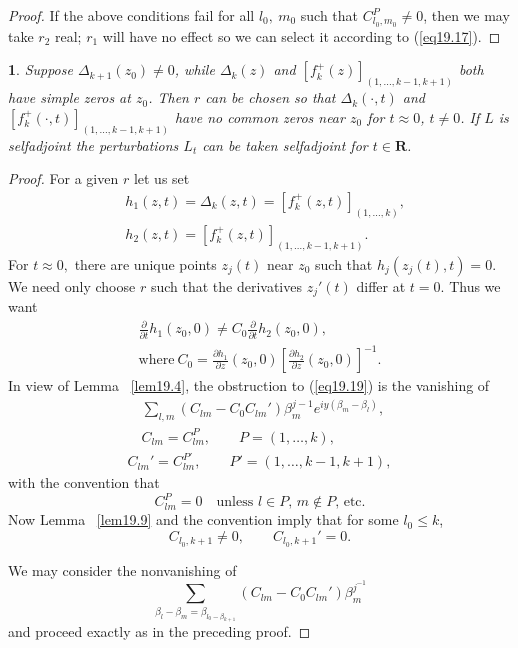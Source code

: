 \documentclass{surv-l}
\theoremstyle{plain}
\newtheorem{lemma}[theorem]{\sc{Lemma}}
\theoremstyle{definition}
\numberwithin{equation}{chapter}
\begin{document}
\begin{proof}
If the above conditions fail for all $l_{0},\ m_{0}$ such that $C_{l_{0},m_{0}}^{P}\neq 0$, then we may take $r_{2}$ real; $r_{1}$ will have no effect so we can select it according to (\ref{eq19.17}).
\end{proof}
\setcounter{theorem}{17}
\begin{lemma}\label{lem19.18} Suppose $\Delta_{k+1}(z_{0})\neq 0$, while $\Delta_{k}(z)$ and $[f_{k}^{+}(z)]_{(1,...,k-1,k+1)}$ both have simple zeros at $z_{0}$.   Then $r$ can be chosen so that $\Delta_{k}(\cdot,t)$ and $[f_{k}^{+}(\cdot,t)]_{(1,\ldots, k-1,k+1)}$ have no common zeros near $z_{0}$ for  $t\approx 0$, $t \neq 0$.  If $L$ is selfadjoint the perturbations $L_{t}$ can be taken selfadjoint for $t\in \mathbf{R}$.
\end{lemma}
\begin{proof} For a given $r$ let us set
\begin{align*}
&h_{1}(z, t)=\Delta_{k}(z,t) = [f_{k}^{+}(z, t)]_{(1,\ldots,k)},\\
&h_{2}(z,t) = [f_{k}^{+}(z,t)]_{(1,\ldots,k-1,k+1)}.
\end{align*}
For $t\approx 0,$ there are unique points $z_{j}(t)$ near $z_{0}$ such that $h_{j}(z_{j}(t),t)=0$. We need only choose $r$ such that the derivatives $z_{j}'(t)$ differ at $t=0$. Thus we want
\setcounter{equation}{18}
\begin{align}\label{eq19.19}
\frac{\partial}{\partial t}h_{1}(z_{0},0)\neq C_{0}\frac{\partial}{\partial t}h_{2}(z_{0},0),\\ \nonumber
\mathrm{where}\ C_{0}=\frac{\partial h_{1}}{\partial z}(z_{0},0)\left[\frac{\partial h_{2}}{\partial z}(z_{0},0)\right]^{-1}.
\end{align}
In view of Lemma ~\ref{lem19.4}, the obstruction to (\ref{eq19.19}) is the vanishing of
\begin{align}\label{eq19.20}
\quad\sum_{l,m}(C_{lm}- C_{0}C_{lm}')\beta_{m}^{j-1}e^{iy(\beta_{m}-\beta_{l})},\\ \nonumber
\quad C_{lm}= C_{lm}^{P},\qquad P=(1,\ldots,k),\\
C_{lm}'= C_{lm}^{P'},\qquad P'= (1,\ldots,k-1,k+1),\nonumber
\end{align}
with the convention that
\begin{equation*}
C_{lm}^{P}=0\quad \text{unless $l\in P$, $m\not\in P$, etc}.
\end{equation*}
Now Lemma ~\ref{lem19.9} and the convention imply that for some $l_{0}\leq k$,
\begin{equation*}
C_{l_{0},k+1}\neq 0,\qquad C_{l_{0},k+1}'= 0.
\end{equation*}

We may consider the nonvanishing of
\begin{equation*}
\sum_{\beta_{l}-\beta_{m}=\beta_{l_{0}-\beta_{k+1}}}(C_{lm}-C_{0}C_{lm}')\beta_{m}^{j^{-1}}
\end{equation*}
and proceed exactly as in the preceding proof.
\end{proof}
\end{document}
